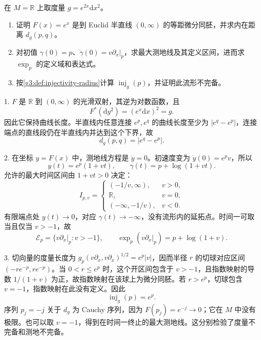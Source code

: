 \begin{exercise}\label{g3:ex:exponential-line-incomplete}
	在 \(M=\mathbb R\) 上取度量 \(g=e^{2x}\mathrm{d}x^2\)。
	\begin{enumerate}
		\item 证明 \(F(x)=e^x\) 是到 Euclid 半直线 \((0,\infty)\) 的等距微分同胚，并求内在距离 \(d_g(p,q)\)。
		\item 对初值 \(\gamma(0)=p\)、\(\dot\gamma(0)=v\partial_x|_p\)，求最大测地线及其定义区间，进而求 \(\exp_p\) 的定义域和表达式。
		\item 按\cref{g3:def:injectivity-radius}计算 \(\operatorname{inj}_g(p)\)，并证明此流形不完备。
	\end{enumerate}
\end{exercise}
\begin{solution}
	1. \(F\) 是 \(\mathbb R\) 到 \((0,\infty)\) 的光滑双射，其逆为对数函数，且
	\[
		F^*(\mathrm{d}y^2)=(e^x\mathrm{d}x)^2=g.
	\]
	因此它保持曲线长度。半直线内任意连接 \(e^p,e^q\) 的曲线长度至少为 \(|e^q-e^p|\)，连接端点的直线段仍在半直线内并达到这个下界，故
	\[
		d_g(p,q)=|e^q-e^p|.
	\]

	2. 在坐标 \(y=F(x)\) 中，测地线方程是 \(\ddot y=0\)。初速度变为 \(\dot y(0)=e^pv\)，所以
	\[
		y(t)=e^p(1+vt),\qquad
		\gamma(t)=p+\log(1+vt).
	\]
	允许的最大时间区间由 \(1+vt>0\) 决定：
	\[
		I_{p,v}=
		\begin{cases}
			(-1/v,\infty),&v>0,\\
			\mathbb R,&v=0,\\
			(-\infty,-1/v),&v<0.
		\end{cases}
	\]
	有限端点处 \(y(t)\to0\)，对应 \(\gamma(t)\to-\infty\)，没有流形内的延拓点。时间一可取当且仅当 \(v>-1\)，故
	\[
		\mathcal E_p=\{v\partial_x|_p:v>-1\},\qquad
		\exp_p(v\partial_x|_p)=p+\log(1+v).
	\]

	3. 切向量的度量长度为 \(g_p(v\partial_x,v\partial_x)^{1/2}=e^p|v|\)，因而半径 \(r\) 的切球对应区间 \((-re^{-p},re^{-p})\)。当 \(0<r\le e^p\) 时，这个开区间包含于 \(v>-1\)，且指数映射的导数 \(1/(1+v)\) 为正，故指数映射在该球上为微分同胚。若 \(r>e^p\)，切球包含 \(v=-1\)，指数映射在此没有定义。因此
	\[
		\operatorname{inj}_g(p)=e^p.
	\]
	序列 \(p_j=-j\) 关于 \(d_g\) 为 Cauchy 序列，因为 \(F(p_j)=e^{-j}\to0\)；它在 \(M\) 中没有极限。也可以取 \(v=-1\)，得到在时间一终止的最大测地线。这分别检验了度量不完备和测地不完备。
\end{solution}

